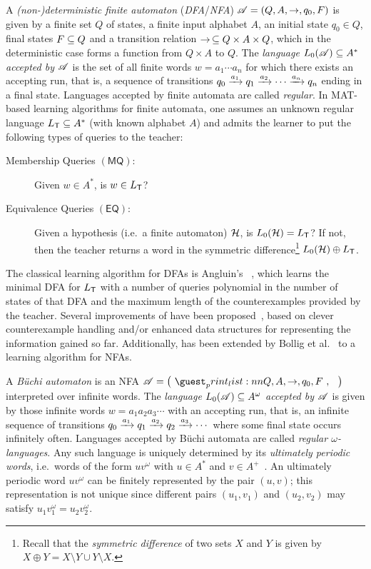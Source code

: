 \documentclass[a4paper,UKenglish,cleveref,autoref,thm-restate,numberwithinsect,final]{lipics-v2021}
\begin{document}
 A \emph{(non-)deterministic finite automaton} (\emph{DFA}/\emph{NFA}) $\mathscr{A} = (Q, A, \to, q_0, F)$ is given by a finite set $Q$ of states, a finite input alphabet $A$, an initial state $q_0\in Q$, final states $F\subseteq Q$ and a transition relation $\to\,\subseteq Q\times A\times Q$, which in the deterministic case forms a function from $Q\times A$ to $Q$. The \emph{language $L_0(\mathscr{A})\subseteq A^*$ accepted by $\mathscr{A}$} is the set of all finite words $w=a_1\cdots a_n$ for which there exists an accepting run, that is, a sequence of transitions $q_0\xrightarrow{a_1} q_1\xrightarrow{a_2}\cdots \xrightarrow{a_n} q_n$ ending in a final state. Languages accepted by finite automata are called \emph{regular}. In MAT-based learning algorithms for finite automata, one assumes an unknown regular language $L_\textsf{T}\subseteq A^*$ (with known alphabet $A$) and admits the learner to put the following types of queries to the teacher:
    \begin{description}
        \item[Membership Queries $(\textsf{MQ})$:] Given $w \in A^*$, is $w\in L_\textsf{T}$?

        \item[Equivalence Queries $(\textsf{EQ})$:] Given a hypothesis (i.e.~a finite automaton) $\mathcal{H}$,
            is $L_0(\mathcal{H})=L_\textsf{T}$? If not, then the teacher returns a word in the symmetric difference\footnote{Recall that the \emph{symmetric difference} of two sets $X$ and $Y$ is given by $X\oplus Y=X\setminus Y\cup Y\setminus X$.} $L_0(\mathcal{H})\oplus L_\textsf{T}$. 
    \end{description}
   The classical learning algorithm for DFAs is Angluin's \Lstar~\cite{angluin87}, which learns the minimal DFA for $L_\textsf{T}$ with a number of queries polynomial in the number of states of that DFA and the maximum length of the counterexamples provided by the teacher. Several improvements of \Lstar have been proposed~\cite{rs93,kv94,ihs14,vgrw22}, based on clever counterexample handling and/or enhanced data structures for representing the information gained so far. Additionally, \Lstar has been extended by Bollig et al.~\cite{bhkl09} to a learning algorithm \NLstar for NFAs.

 A \emph{Büchi automaton} is an NFA $\A = \maketuple{Q, A, \to, q_0, F}$ interpreted over infinite words. The
                \emph{language} $L_0(\mathscr{A})\subseteq A^\omega$ \emph{accepted by $\mathscr{A}$} is given by those infinite words $w=a_1a_2a_3\cdots$ with an accepting run, that is, an infinite sequence of transitions $q_0\xrightarrow{a_1} q_1\xrightarrow{a_2} q_2\xrightarrow{a_3} \cdots$ where some final state occurs infinitely often. Languages accepted by Büchi automata are called \emph{regular $\omega$-languages}. Any such language is uniquely determined by its \emph{ultimately periodic words}, i.e.~words of the form $uv^\omega$ with $u \in A^*$ and $v \in A^+$~\cite{mcn66}. An ultimately periodic word $uv^\omega$ can be finitely represented by the pair $(u,v)$; this representation is not unique since different pairs $(u_1,v_1)$ and $(u_2,v_2)$ may satisfy $u_1v_1^\omega=u_2v_2^\omega$. 
\end{document}
